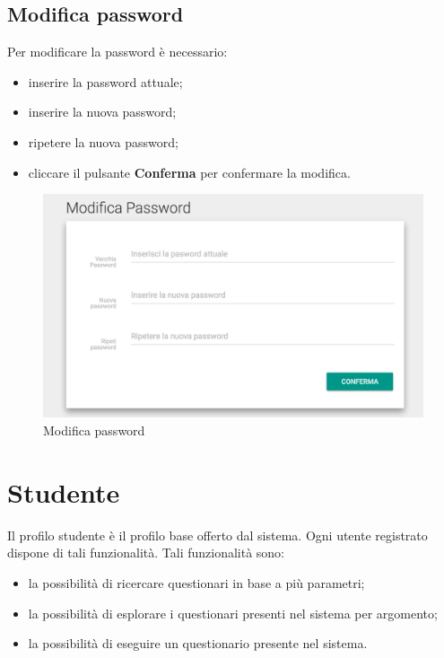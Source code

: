 \documentclass[12pt,a4paper]{article}
\begin{document}
	\subsection{Modifica password}
	Per modificare la password  è necessario:
	\begin{itemize}
		\item inserire la password attuale;
		\item inserire la nuova password;
		\item ripetere la nuova password;
		\item cliccare il pulsante \textbf{Conferma} per confermare la modifica.
	\end{itemize}
	\begin{figure}[h]
		\centering
		\includegraphics[width=1.0\linewidth]{../img/screenshot/user2.png}
		\caption{Modifica password}
		\label{Modifica password}
	\end{figure}
	
	\newpage

	\section{Studente}\label{studente}
	Il profilo studente è il profilo  base offerto dal sistema. Ogni utente registrato dispone di tali funzionalità. Tali funzionalità sono:
	\begin{itemize}
		\item la possibilità di ricercare questionari in base a più parametri;
		\item la possibilità di esplorare i questionari presenti nel sistema per argomento;
		\item la possibilità di eseguire un questionario presente nel sistema.
	\end{itemize}
	
\end{document}
